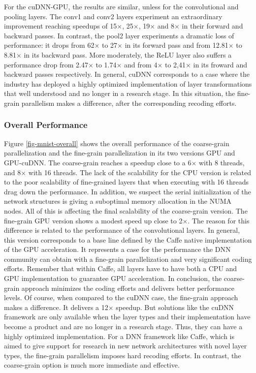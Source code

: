 For the cuDNN-GPU, the results are similar, unless for the convolutional 
and pooling layers. The conv1 and conv2 layers experiment an extraordinary 
improvement reaching speedups of 15$\times$, 25$\times$, 19$\times$ and 8$\times$ in their 
forward and backward passes. In contrast, the pool2 layer experiments a 
dramatic loss of performance: it drops from 62$\times$ to 27$\times$ in its forward 
pass and from 12.81$\times$ to 8.81$\times$ in its backward pass. More moderately, 
the ReLU layer also suffers a performance drop from 2.47$\times$ to 1.74$\times$ and 
from 4$\times$ to 2,41$\times$ in its froward and backward passes respectively. 
In general, cuDNN corresponds to a case where the industry has deployed 
a highly optimized implementation of layer transformations that well 
understood and no longer in a research stage. In this situation, the 
fine-grain parallelism makes a difference, after the corresponding recoding 
efforts.


\subsubsection{Overall Performance}
Figure \ref{fig-mnist-overall} shows the overall performance of
the coarse-grain parallelization and the fine-grain parallelization in 
its two versions GPU and GPU-cuDNN. The coarse-grain reaches a speedup 
close to a 6$\times$ with 8 threads, and 8$\times$ with 16 threads. The lack of 
the scalability for the CPU version is related to the poor scalability 
of fine-grained layers that when executing with 16 threads drag down 
the performance. In addition, we suspect the serial initialization of 
the network structures is giving a suboptimal memory allocation in 
the NUMA nodes. All of this is affecting the final scalability of 
the coarse-grain version. The fine-grain GPU version shows a 
modest speed up close to 2$\times$. The reason for this difference is related 
to the performance of the convolutional layers. In general, this version 
corresponds to a base line defined by the Caffe native implementation 
of the GPU acceleration. It represents a case for the performance the DNN 
community can obtain with a fine-grain parallelization and very significant 
coding efforts. Remember that within Caffe, all layers have to have 
both a CPU and GPU implementation to guarantee GPU acceleration. 
In conclusion, the coarse-grain approach minimizes the coding efforts 
and delivers better performance levels. Of course, when compared to 
the cuDNN case, the fine-grain approach makes a difference. 
It delivers a 12$\times$ speedup. But solutions like the cuDNN framework are 
only available when the layer types and their implementation have become 
a product and are no longer in a research stage. Thus, they can have a 
highly optimized implementation. For a DNN framework like Caffe, 
which is aimed to give support for research in new network architectures 
with novel layer types, the fine-grain parallelism imposes hard recoding 
efforts. In contrast, the coarse-grain option is much more immediate and 
effective.

